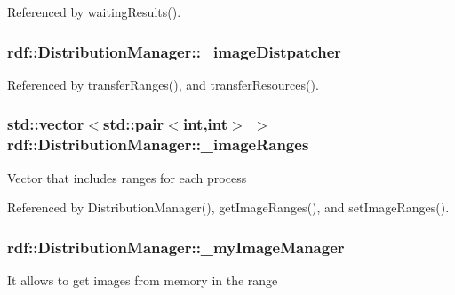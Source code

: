 Referenced by waiting\+Results().

\subsubsection[{\texorpdfstring{\+\_\+image\+Distpatcher}{_imageDistpatcher}}]{ rdf\+::\+Distribution\+Manager\+::\+\_\+image\+Distpatcher\hspace{0.3cm}{\ttfamily [private]}}\hypertarget{classrdf_1_1DistributionManager_a43d6497690b1040281e7dfd64ed4dc65}{}\label{classrdf_1_1DistributionManager_a43d6497690b1040281e7dfd64ed4dc65}


Referenced by transfer\+Ranges(), and transfer\+Resources().

\subsubsection[{\texorpdfstring{\+\_\+image\+Ranges}{_imageRanges}}]{\setlength{\rightskip}{0pt plus 5cm}std\+::vector$<$std\+::pair$<$int,int$>$ $>$ rdf\+::\+Distribution\+Manager\+::\+\_\+image\+Ranges\hspace{0.3cm}{\ttfamily [private]}}\hypertarget{classrdf_1_1DistributionManager_a5f3f6245bed7bfcf34204fc16e655656}{}\label{classrdf_1_1DistributionManager_a5f3f6245bed7bfcf34204fc16e655656}
Vector that includes ranges for each process 

Referenced by Distribution\+Manager(), get\+Image\+Ranges(), and set\+Image\+Ranges().

\subsubsection[{\texorpdfstring{\+\_\+my\+Image\+Manager}{_myImageManager}}]{ rdf\+::\+Distribution\+Manager\+::\+\_\+my\+Image\+Manager\hspace{0.3cm}{\ttfamily [private]}}\hypertarget{classrdf_1_1DistributionManager_aa265ab894795aa960fdcc67f0934934f}{}\label{classrdf_1_1DistributionManager_aa265ab894795aa960fdcc67f0934934f}
It allows to get images from memory in the range 

